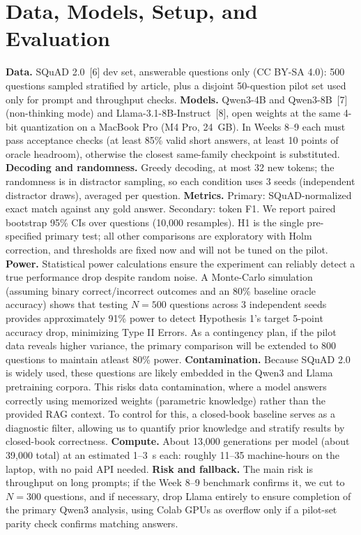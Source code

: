 \documentclass[11pt]{article}
\begin{document}
\section{Data, Models, Setup, and Evaluation}
\textbf{Data.} SQuAD 2.0~[6] dev set, answerable questions only (CC BY-SA 4.0): 500 questions sampled stratified by article, plus a disjoint 50-question pilot set used only for prompt and throughput checks. \textbf{Models.} Qwen3-4B and Qwen3-8B~[7] (non-thinking mode) and Llama-3.1-8B-Instruct~[8], open weights at the same 4-bit quantization on a MacBook Pro (M4 Pro, 24~GB). In Weeks 8--9 each must pass acceptance checks (at least 85\% valid short answers, at least 10 points of oracle headroom), otherwise the closest same-family checkpoint is substituted. \textbf{Decoding and randomness.} Greedy decoding, at most 32 new tokens; the randomness is in distractor sampling, so each condition uses 3 seeds (independent distractor draws), averaged per question. \textbf{Metrics.} Primary: SQuAD-normalized exact match against any gold answer. Secondary: token F1. We report paired bootstrap 95\% CIs over questions (10,000 resamples). H1 is the single pre-specified primary test; all other comparisons are exploratory with Holm correction, and thresholds are fixed now and will not be tuned on the pilot. \textbf{Power.} Statistical power calculations ensure the experiment can reliably detect a true performance drop despite random noise. A Monte-Carlo simulation (assuming binary correct/incorrect outcomes and an 80\% baseline oracle accuracy) shows that testing $N=500$ questions across 3 independent seeds provides approximately 91\% power to detect Hypothesis 1's target 5-point accuracy drop, minimizing Type II Errors. As a contingency plan, if the pilot data reveals higher variance, the primary comparison will be extended to 800 questions to maintain atleast 80\% power. \textbf{Contamination.} Because SQuAD 2.0 is widely used, these questions are likely embedded in the Qwen3 and Llama pretraining corpora. This risks data contamination, where a model answers correctly using memorized weights (parametric knowledge) rather than the provided RAG context. To control for this, a closed-book baseline serves as a diagnostic filter, allowing us to quantify prior knowledge and stratify results by closed-book correctness. \textbf{Compute.} About 13{,}000 generations per model (about 39{,}000 total) at an estimated 1--3~s each: roughly 11--35 machine-hours on the laptop, with no paid API needed. \textbf{Risk and fallback.} The main risk is throughput on long prompts; if the Week 8--9 benchmark confirms it, we cut to $N=300$ questions, and if necessary, drop Llama entirely to ensure completion of the primary Qwen3 analysis, using Colab GPUs as overflow only if a pilot-set parity check confirms matching answers.
\end{document}

